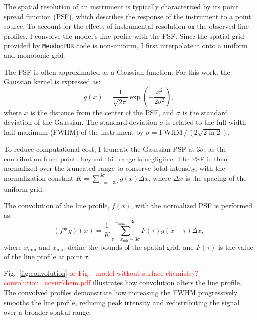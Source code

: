 \documentclass[12pt,a4paper]{article}
\newcommand{\mdpdr}{\texttt{MeudonPDR} code}
\newcommand{\qt}[1]{\textcolor{red}{#1}}
\begin{document}
The spatial resolution of an instrument is typically characterized by its point spread function (PSF), which describes the response of the instrument to a point source. To account for the effects of instrumental resolution on the observed line profiles, I convolve the model's line profile with the PSF. Since the spatial grid provided by \mdpdr{} is non-uniform, I first interpolate it onto a uniform and monotonic grid.

The PSF is often approximated as a Gaussian function. For this work, the Gaussian kernel is expressed as:
\begin{equation}
    g(x) = \frac{1}{\sqrt{2\pi}}\exp(-\frac{x^2}{2\sigma^2}),
\end{equation}
where $x$ is the distance from the center of the PSF, and $\sigma$ is the standard deviation of the Gaussian. The standard deviation $\sigma$ is related to the full width half maximum (FWHM) of the instrument by $\sigma = \text{FWHM}\,/\,(2\sqrt{2 \ln 2})$.

To reduce computational cost, I truncate the Gaussian PSF at $3\sigma$, as the contribution from points beyond this range is negligible. The PSF is then normalized over the truncated range to conserve total intensity, with the normalization constant $K = \sum_{x=-3\sigma}^{3\sigma} g(x) \Delta x$, where $\Delta x$ is the spacing of the uniform grid.

The convolution of the line profile, $f(x)$, with the normalized PSF is performed as:
\begin{equation}
    (f * g) (x) = \frac{1}{K} \sum_{\tau = x_{\min} - 3\sigma}^{x_{\max} + 3\sigma}F(\tau)g(x - \tau)\Delta x,
\end{equation}
where $x_{\min}$ and $x_{\max}$ define the bounds of the spatial grid, and $F(\tau)$ is the value of the line profile at point $\tau$. 

Fig.~\ref{fig:convolution} \qt{or Fig.~ model without surface chemistry? convolution\_nosurfchem.pdf} illustrates how convolution alters the line profile. The convolved profiles demonstrate how increasing the FWHM progressively smooths the line profile, reducing peak intensity and redistributing the signal over a broader spatial range.

\end{document}

